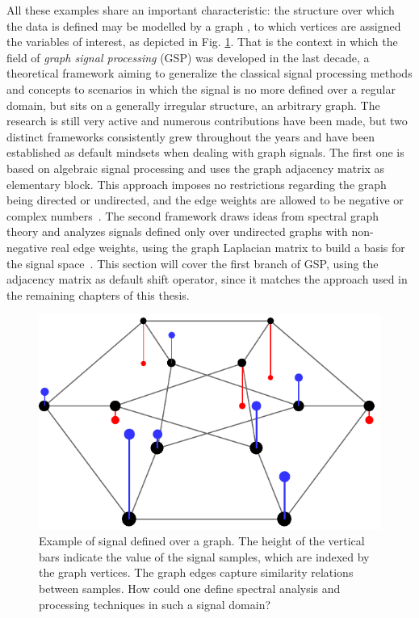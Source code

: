 All these examples share an important characteristic: the structure over which the data is defined may be modelled by a graph \cite{mei2016signal}, to which vertices are assigned the variables of interest, as depicted in Fig. \ref{fig:duher}. That is the context in which the field of \emph{graph signal processing} (GSP) was developed in the last decade, a theoretical framework aiming to generalize the classical signal processing methods and concepts to scenarios in which the signal is no more defined over a regular domain, but sits on a generally irregular structure, an arbitrary graph. The research is still very active and numerous contributions have been made, but two distinct frameworks consistently grew throughout the years and have been established as default mindsets when dealing with graph signals. The first one is based on algebraic signal processing and uses the graph adjacency matrix as elementary block. This approach imposes no restrictions regarding the graph being directed or undirected, and the edge weights are allowed to be negative or complex numbers~\cite{sandryhaila2014big}. The second framework draws ideas from spectral graph theory and analyzes signals defined only over undirected graphs with non-negative real edge weights, using the graph Laplacian matrix to build a basis for the signal space~\cite{shuman2013emerging}. This section will cover the first branch of GSP, using the adjacency matrix as default shift operator, since it matches the approach used in the remaining chapters of this thesis.

\begin{figure}
	\centering
	\includegraphics[width=0.35\linewidth]{Figures/signal_duher_graph_2.pdf}
	\caption{Example of signal defined over a graph. The height of the vertical bars indicate the value of the signal samples, which are indexed by the graph vertices. The graph edges capture similarity relations between samples. How could one define spectral analysis and processing techniques in such a signal domain?}
	\label{fig:duher}
\end{figure}

